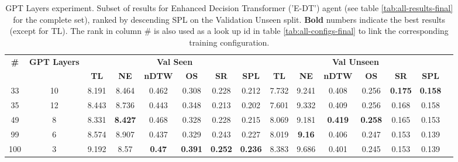 \begin{table}
\centering
\caption{\label{tab:e_dt_layers}GPT Layers experiment. Subset of results for Enhanced Decision Transformer ('E-DT') agent (see table \ref{tab:all-results-final} for the complete set), ranked by descending SPL on the Validation Unseen split. \textbf{Bold} numbers indicate the best results (except for TL). The rank in column \# is also used as a look up id in table \ref{tab:all-configs-final} to link the corresponding training configuration.}
\begin{tabular}{@{\hskip3pt}c@{\hskip3pt}c@{\hskip3pt}c@{\hskip3pt}c@{\hskip3pt}c@{\hskip3pt}c@{\hskip3pt}c@{\hskip3pt}c@{\hskip3pt}c@{\hskip3pt}c@{\hskip3pt}c@{\hskip3pt}c@{\hskip3pt}c@{\hskip3pt}c@{\hskip3pt}c}
\toprule
                                  \textbf{\#} & \textbf{GPT Layers} & \multicolumn{6}{c}{\textbf{Val Seen}} & \multicolumn{6}{c}{\textbf{Val Unseen}} \\
\cmidrule(l){3-8}\cmidrule(l){9-14}\textbf{~} &          \textbf{~} &       \textbf{TL} &     \textbf{NE} &  \textbf{nDTW} &     \textbf{OS} &     \textbf{SR} &    \textbf{SPL} &         \textbf{TL} &    \textbf{NE} &   \textbf{nDTW} &     \textbf{OS} &     \textbf{SR} &    \textbf{SPL} \\
\midrule
                                           33 &                  10 &             8.191 &           8.464 &          0.462 &           0.308 &           0.228 &           0.212 &               7.732 &          9.241 &           0.408 &           0.256 &  \textbf{0.175} &  \textbf{0.158} \\
                                           35 &                  12 &             8.443 &           8.736 &          0.443 &           0.348 &           0.213 &           0.202 &               7.601 &          9.332 &           0.409 &           0.256 &           0.168 &           0.158 \\
                                           49 &                   8 &             8.331 &  \textbf{8.427} &          0.468 &           0.328 &           0.228 &           0.215 &               8.069 &          9.181 &  \textbf{0.419} &  \textbf{0.258} &           0.165 &           0.153 \\
                                           99 &                   6 &             8.574 &           8.907 &          0.437 &           0.329 &           0.243 &           0.227 &               8.019 &  \textbf{9.16} &           0.406 &           0.247 &           0.153 &           0.139 \\
                                          100 &                   3 &             9.192 &            8.57 &  \textbf{0.47} &  \textbf{0.391} &  \textbf{0.252} &  \textbf{0.236} &               8.383 &          9.686 &           0.401 &           0.245 &           0.153 &           0.139 \\
\bottomrule
\end{tabular}
\end{table}
